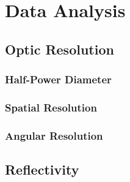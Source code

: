 \chapter{Data Analysis}

\section{Optic Resolution\label{sec:res}}

\subsection{Half-Power Diameter\label{sec:hpd}}

\subsection{Spatial Resolution\label{sec:spres}}

\subsection{Angular Resolution\label{sec:angres}}

\section{Reflectivity}
